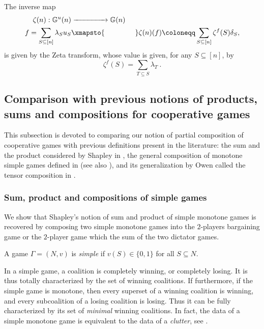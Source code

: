 \documentclass[a4paper,12pt]{amsart}
\begin{document}
\begin{remark}
The inverse map 
\[ \begin{aligned} 
\zeta(n): \mathbb{G}^u(n) & \xrightarrow{\hspace{1.5cm}} \mathbb{G}(n) \\
f = \sum_{S \subseteq [n]} \lambda_S u_S & \xmapsto{\hspace{1.5cm}} \zeta(n)(f) \coloneqq \sum_{S \subseteq [n]} \zeta^f(S) \delta_S, 
\end{aligned} \]
is given by the Zeta transform, whose value is given, for any $S \subseteq [n]$, by 
\[
\zeta^f(S) = \sum_{T \subseteq S} \lambda_T~. 
\]
\end{remark}

\subsection{Comparison with previous notions of products, sums and compositions for cooperative games}
This subsection is devoted to comparing our notion of partial composition of cooperative games with previous definitions present in the literature: the sum and the product considered by Shapley in \cite{ShapleyCompoundI}, the general composition of monotone simple games defined in \cite{ShapleyCompoundII} (see also \cite{ShapleyComposition}), and its generalization by Owen called the tensor composition in \cite{OwenTensor,OwenMultilinear}. 

\subsubsection{Sum, product and compositions of simple games}\label{subsub: sum and product of simple games} We show that Shapley's notion of sum and product of simple monotone games is recovered by composing two simple monotone games into the $2$-players bargaining game or the $2$-player game which the sum of the two dictator games. 

\begin{definition}
A game $\Gamma = (N, v)$ is \emph{simple} if \(v(S) \in \{0, 1\}\) for all \(S \subseteq N\). 
\end{definition}

In a simple game, a coalition is completely winning, or completely losing. It is thus totally characterized by the set of winning coalitions. If furthermore, if the simple game is monotone, then every superset of a winning coalition is winning, and every subcoalition of a losing coalition is losing. Thus it can be fully characterized by its set of \textit{minimal} winning coalitions. In fact, the data of a simple monotone game is equivalent to the data of a \textit{clutter}, see \cite{billera1971composition}. 
\end{document}
